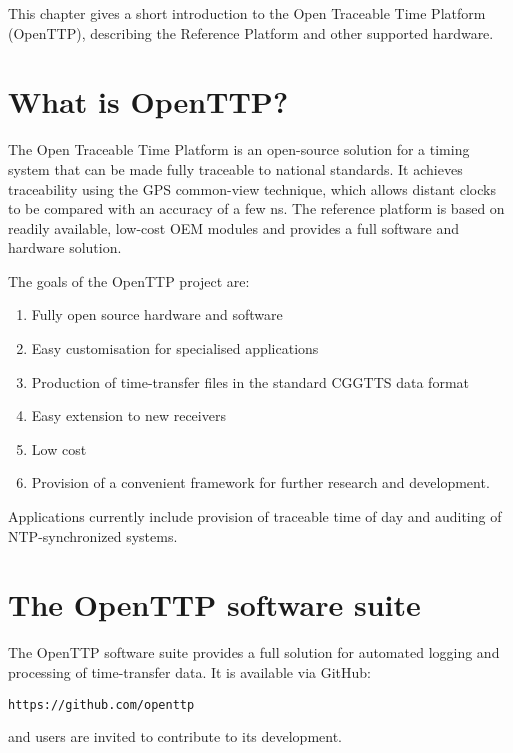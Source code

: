 


This chapter gives a short introduction to the Open Traceable Time Platform (OpenTTP), describing the Reference Platform and other supported hardware.

\section{What is OpenTTP?}

The Open Traceable Time Platform is an open-source solution for a timing system that can be made fully traceable to national standards.
It achieves traceability using the GPS common-view technique, which allows distant clocks to be compared with an accuracy of a few ns.
The reference platform is based on readily available, low-cost OEM modules and provides a full software and hardware solution. 

The goals of the OpenTTP project are:
\begin{enumerate}

	\item Fully open source hardware and software 
	
	\item Easy customisation for specialised applications
	
	\item Production of time-transfer files in the standard CGGTTS data format
	
	\item Easy extension to new receivers

	\item Low cost
	
	\item Provision of a convenient framework for further research and development.

\end{enumerate}

Applications currently include provision of traceable time of day and auditing of NTP-synchronized systems.

\section{The OpenTTP software suite}

The OpenTTP software suite provides a full solution for automated logging and processing of time-transfer data.
It is available via GitHub:
\begin{lstlisting}
https://github.com/openttp
\end{lstlisting}
and users are invited to contribute to its development.

